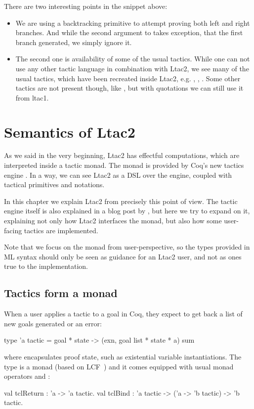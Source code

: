 There are two interesting points in the snippet above:
\begin{itemize}
\item We are using a backtracking primitive  to attempt proving both left and right branches.
  And while the second argument to  takes exception, that the first branch generated, we simply ignore it.
\item The second one is availability of some of the usual tactics.
  While one can not use any other tactic language in combination with Ltac2, we see many of the usual tactics, which have been recreated inside Ltac2, e.g.  , , .
  Some other tactics are not present though, like , but with quotations we can still use it from ltac1.
\end{itemize}

\section{Semantics of Ltac2}
\label{sec:semantics-ltac2}

As we said in the very beginning, Ltac2 has effectful computations, which are interpreted inside a tactic monad.
The monad is provided by Coq's new tactics engine \cite{spiwackAbstractTypeConstructing2010}.
In a way, we can see Ltac2 as a DSL over the engine, coupled with tactical primitives and notations.

In this chapter we explain Ltac2 from precisely this point of view.
The tactic engine itself is also explained in a blog post by \citet{pedrotCoqHoTTminuteTickingClockwork2016}, but here we try to expand on it, explaining not only how Ltac2 interfaces the monad, but also how some user-facing tactics are implemented.

Note that we focus on the monad from user-perspective, so the types provided in ML syntax should only be seen as guidance for an Ltac2 user, and not as ones true to the implementation.

\subsection{Tactics form a monad}
\label{sec:monad-tactics}

When a user applies a tactic to a goal in Coq, they expect to get back a list of new goals generated or an error:
\begin{ocaml}
type 'a tactic = goal * state -> (exn, goal list * state * a) sum
\end{ocaml}
where  encapsulates proof state, such as existential variable instantiations.
The  type is a monad (based on LCF~\cite{gordonEdinburghLCFMechanised1979}) and it comes equipped with usual monad operators  and :
\begin{ocaml}
val tclReturn : 'a -> 'a tactic.
val tclBind : 'a tactic -> ('a -> 'b tactic) -> 'b tactic.
\end{ocaml}

